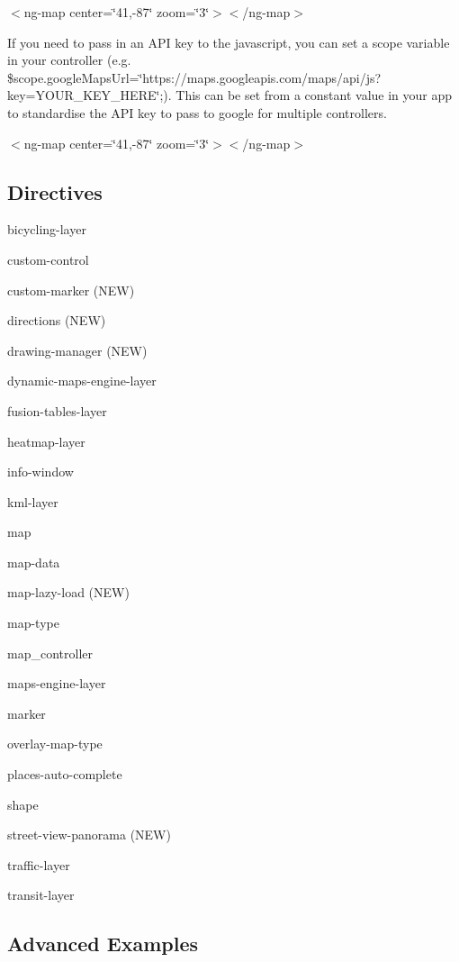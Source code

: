  $<$ng-\/map center=\char`\"{}41,-\/87\char`\"{} zoom=\char`\"{}3\char`\"{}$>$$<$/ng-\/map$>$ 

If you need to pass in an A\+PI key to the javascript, you can set a scope variable in your controller (e.\+g. {\ttfamily \$scope.\+google\+Maps\+Url=\char`\"{}https\+://maps.\+googleapis.\+com/maps/api/js?key=\+Y\+O\+U\+R\+\_\+\+K\+E\+Y\+\_\+\+H\+E\+R\+E\char`\"{};}). This can be set from a constant value in your app to standardise the A\+PI key to pass to google for multiple controllers.

 $<$ng-\/map center=\char`\"{}41,-\/87\char`\"{} zoom=\char`\"{}3\char`\"{}$>$$<$/ng-\/map$>$ 

\subsection*{Directives }


\begin{DoxyItemize}
\item bicycling-\/layer
\item custom-\/control
\item custom-\/marker (N\+EW)
\item directions (N\+EW)
\item drawing-\/manager (N\+EW)
\item dynamic-\/maps-\/engine-\/layer
\item fusion-\/tables-\/layer
\item heatmap-\/layer
\item info-\/window
\item kml-\/layer
\item map
\item map-\/data
\item map-\/lazy-\/load (N\+EW)
\item map-\/type
\item map\+\_\+controller
\item maps-\/engine-\/layer
\item marker
\item overlay-\/map-\/type
\item places-\/auto-\/complete
\item shape
\item street-\/view-\/panorama (N\+EW)
\item traffic-\/layer
\item transit-\/layer
\end{DoxyItemize}

\subsection*{Advanced Examples }



